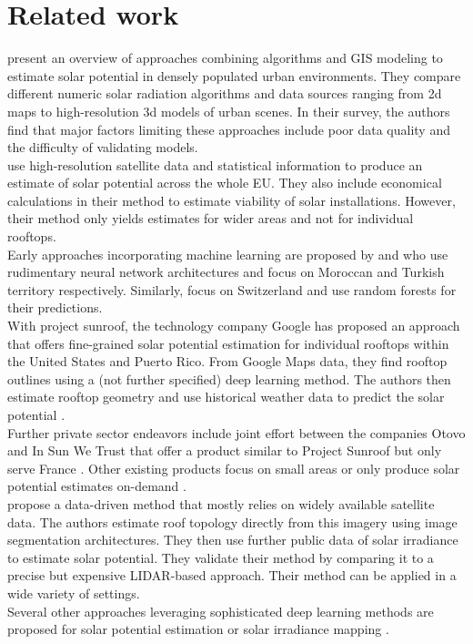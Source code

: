 \documentclass{article} %
\begin{document}
\section*{Related work}
\citet{freitas2015modelling} present an overview of approaches combining algorithms and GIS modeling to estimate solar potential in densely populated urban environments. They compare different numeric solar radiation algorithms and data sources ranging from 2d maps to high-resolution 3d models of urban scenes. In their survey, the authors find that major factors limiting these approaches include poor data quality and the difficulty of validating models.\\
\citet{bodis2019high} use high-resolution satellite data and statistical information to produce an estimate of solar potential across the whole EU. They also include economical calculations in their method to estimate viability of solar installations. However, their method only yields estimates for wider areas and not for individual rooftops.\\
Early approaches incorporating machine learning are proposed by \citet{ouammi2012artificial} and \citet{sozen2004use} who use rudimentary neural network architectures and focus on Moroccan and Turkish territory respectively. Similarly, \citet{assouline2018large} focus on Switzerland and use random forests for their predictions.\\
With project sunroof, the technology company Google has proposed an approach that offers fine-grained solar potential estimation for individual rooftops within the United States and Puerto Rico. From Google Maps data, they find rooftop outlines using a (not further specified) deep learning method. The authors then estimate rooftop geometry and use historical weather data to predict the solar potential \cite{sunroof}.\\
Further private sector endeavors include joint effort between the companies Otovo and In Sun We Trust that offer a product similar to Project Sunroof but only serve France \cite{insun}. Other existing products focus on small areas or only produce solar potential estimates on-demand \cite{insun, rhino}.\\
\citet{lee2019deeproof} propose a data-driven method that mostly relies on widely available satellite data. The authors estimate roof topology directly from this imagery using image segmentation architectures. They then use further public data of solar irradiance to estimate solar potential. They validate their method by comparing it to a precise but expensive LIDAR-based approach. Their method can be applied in a wide variety of settings.\\
Several other approaches leveraging sophisticated deep learning methods are proposed for solar potential estimation \cite{huang2019urban, zhong2021city} or solar irradiance mapping \cite{kumari2021deep, chandola2020multi, bamisile2020application}.
\end{document}
